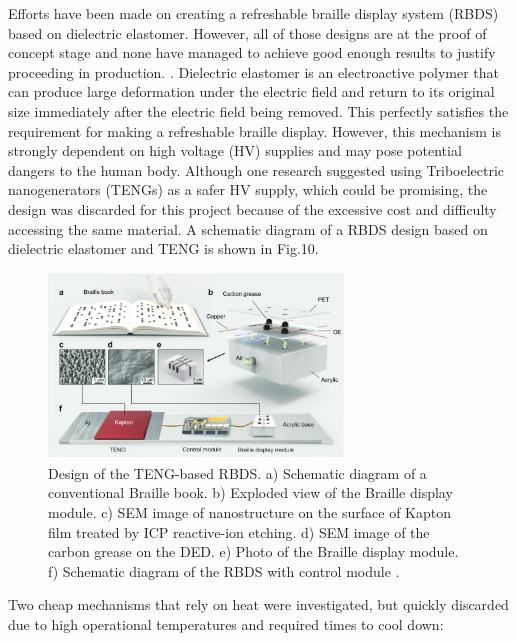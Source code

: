 Efforts have been made on creating a refreshable braille display system (RBDS) based on dielectric elastomer. However, all of those designs are at the proof of concept stage and none have managed to achieve good enough results to justify proceeding in production. \cite{qu_refreshable_2021}.
Dielectric elastomer is an electroactive polymer that can produce large deformation under the electric field and return to its original size immediately after the electric field being removed.
This perfectly satisfies the requirement for making a refreshable braille display. 
However, this mechanism is strongly dependent on high voltage (HV) supplies and may pose potential dangers to the human body.
Although one research suggested using Triboelectric nanogenerators (TENGs) as a safer HV supply, which could be promising, the design was discarded for this project because of the excessive cost and difficulty accessing the same material. 
A schematic diagram of a RBDS design based on dielectric elastomer and TENG is shown in Fig.10.

\begin{figure}[h]\centering
    \includegraphics[width=0.7\textwidth]{figures/teng.png}
    \caption[Dielectric elastomer Braille display]{Design of the TENG-based RBDS. a) Schematic diagram of a conventional Braille book. b) Exploded view of the Braille display module. c) SEM image of nanostructure on the surface of Kapton film treated by ICP reactive-ion etching. d) SEM image of the carbon grease on the DED. e) Photo of the Braille display module. f) Schematic diagram of the RBDS with control module \cite{qu_refreshable_2021}.}
    \label{fig:teng.png}
\end{figure}

Two cheap mechanisms that rely on heat were investigated, but quickly discarded due to high operational temperatures and required times to cool down:


